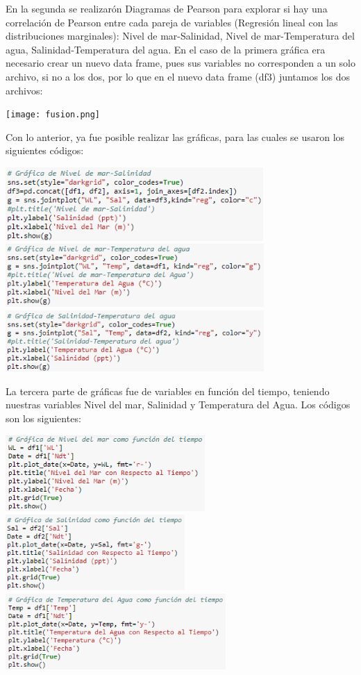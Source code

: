 \documentclass[12pt]{article}
\begin{document}
En la segunda se realizarón Diagramas de Pearson para explorar si hay una correlación de Pearson entre cada pareja de variables (Regresión lineal con las distribuciones marginales): Nivel de mar-Salinidad, Nivel de mar-Temperatura del agua, Salinidad-Temperatura del agua. En el caso de la primera gráfica era necesario crear un nuevo data frame, pues sus variables no corresponden a un solo archivo, si no a los dos, por lo que en el nuevo data frame (df3) juntamos los dos archivos:
\begin{center}
	\texttt{[image: fusion.png]}
\end{center}
Con lo anterior, ya fue posible realizar las gráficas, para las cuales se usaron los siguientes códigos:
\begin{center}
	\includegraphics[height=2.8cm]{c1.png}
    \includegraphics[height=2.4cm]{gc2.png}
    \includegraphics[height=2.34cm]{c3.png}
\end{center}
La tercera parte de gráficas fue de variables en función del tiempo, teniendo nuestras variables Nivel del mar, Salinidad y Temperatura del Agua. Los códigos son los siguientes:
\begin{center}
	\includegraphics[height=2.9cm]{d1.png}
    \includegraphics[height=2.9cm]{d2.png}
    \includegraphics[height=2.9cm]{d3.png}
\end{center}
\end{document}
